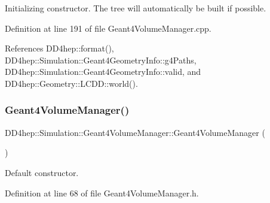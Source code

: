 Initializing constructor. The tree will automatically be built if possible. 



Definition at line 191 of file Geant4\+Volume\+Manager.\+cpp.



References D\+D4hep\+::format(), D\+D4hep\+::\+Simulation\+::\+Geant4\+Geometry\+Info\+::g4\+Paths, D\+D4hep\+::\+Simulation\+::\+Geant4\+Geometry\+Info\+::valid, and D\+D4hep\+::\+Geometry\+::\+L\+C\+D\+D\+::world().

\hypertarget{class_d_d4hep_1_1_simulation_1_1_geant4_volume_manager_aaa373dec70850279290ca95c852d19db}{}\label{class_d_d4hep_1_1_simulation_1_1_geant4_volume_manager_aaa373dec70850279290ca95c852d19db} 
\subsubsection{\texorpdfstring{Geant4\+Volume\+Manager()}{Geant4VolumeManager()}\hspace{0.1cm}{\footnotesize\ttfamily [2/5]}}
{\footnotesize\ttfamily D\+D4hep\+::\+Simulation\+::\+Geant4\+Volume\+Manager\+::\+Geant4\+Volume\+Manager (\begin{DoxyParamCaption}{ }\end{DoxyParamCaption})\hspace{0.3cm}{\ttfamily [inline]}}



Default constructor. 



Definition at line 68 of file Geant4\+Volume\+Manager.\+h.

\hypertarget{class_d_d4hep_1_1_simulation_1_1_geant4_volume_manager_a7f1f31944a14314f82c3e82cc39e46ea}{}\label{class_d_d4hep_1_1_simulation_1_1_geant4_volume_manager_a7f1f31944a14314f82c3e82cc39e46ea} 
